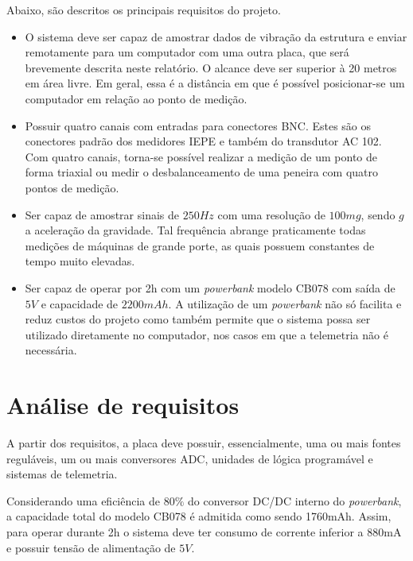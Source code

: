\documentclass[
	12pt,				%
	openright,			%
	twoside,			%
	a4paper,			%
	english,			%
	french,				%
	spanish,			%
	brazil,				%
	]{abntex2}
\begin{document}
		Abaixo, são descritos os principais requisitos do projeto.

		\begin{itemize}
			\item O sistema deve ser capaz de amostrar dados de vibração da
			estrutura e enviar remotamente para um computador com uma outra
			placa, que será brevemente descrita neste relatório. O alcance
			deve ser superior à 20 metros em área livre. Em geral, essa é a distância em que é possível posicionar-se um computador em relação ao ponto de medição.
			
			\item Possuir quatro canais com entradas para conectores BNC. Estes são os conectores padrão dos medidores IEPE e também do transdutor AC 102. Com quatro canais, torna-se possível realizar a medição de um ponto de forma triaxial ou medir o desbalanceamento de uma peneira com quatro pontos de medição.
			
			\item Ser capaz de amostrar sinais de $250Hz$ com uma resolução de $100mg$, sendo $g$
			a aceleração da gravidade. Tal frequência abrange praticamente todas medições de máquinas de grande porte, as quais possuem constantes de tempo muito elevadas.
			
			\item Ser capaz de operar por 2h com um \textit{powerbank} modelo CB078 com saída de $5V$
			e capacidade de $2200mAh$. A utilização de um \textit{powerbank} não só facilita e reduz custos do projeto como também permite que o sistema possa ser utilizado diretamente no computador, nos casos em que a telemetria não é necessária.
			
		\end{itemize}

	\section{Análise de requisitos}
	
		A partir dos requisitos, a placa deve possuir, essencialmente, uma
		ou mais fontes reguláveis, um ou mais conversores ADC, unidades de lógica programável
		e sistemas de telemetria.

		Considerando uma eficiência de $80\%$ do conversor DC/DC interno do
		\textit{powerbank}, a capacidade total do modelo CB078 é admitida como sendo
		1760mAh. Assim, para operar durante 2h o sistema deve ter consumo de
		corrente inferior a 880mA e possuir tensão de alimentação de $5V$.
\end{document}
